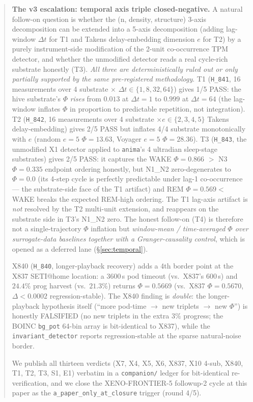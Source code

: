 \documentclass[11pt,a4paper]{article}
\begin{document}
\begin{abstract}
\textbf{The v3 escalation: temporal axis triple closed-negative.}
A natural follow-on question is whether the (n, density, structure)
3-axis decomposition can be extended into a 5-axis decomposition
(adding lag-window $\Delta t$ for T1 and Takens delay-embedding
dimension $e$ for T2) by a purely instrument-side modification of
the 2-unit co-occurrence TPM detector, and whether the unmodified
detector reads a real cycle-rich substrate honestly (T3).
\emph{All three are deterministically ruled out or only partially
supported by the same pre-registered methodology}.
T1 (\texttt{H\_841}, 16 measurements over 4 substrate $\times$
$\Delta t \in\{1,8,32,64\}$) gives 1/5 PASS: the hive substrate's
$\Phi$ \emph{rises} from $0.013$ at $\Delta t=1$ to $0.999$ at
$\Delta t=64$ (the lag-window inflates $\Phi$ in proportion to
predictable repetition, not integration). T2 (\texttt{H\_842},
16 measurements over 4 substrate $\times e\in\{2,3,4,5\}$ Takens
delay-embedding) gives 2/5 PASS but inflates 4/4 substrate
monotonically with $e$ (random $e{=}5$ $\Phi=13.63$, Voyager $e{=}5$
$\Phi=28.36$). T3 (\texttt{H\_843}, the unmodified X1 detector
applied to \texttt{anima}'s 4 ultradian sleep-stage substrates)
gives 2/5 PASS: it captures the WAKE $\Phi=0.866$ $>$ N3 $\Phi=0.335$
endpoint ordering honestly, but N1\_N2 zero-degenerates to $\Phi=0.0$
(its 4-step cycle is perfectly predictable under lag-1 co-occurrence
--- the substrate-side face of the T1 artifact) and REM
$\Phi=0.569 <$ WAKE breaks the expected REM-high ordering. The T1
lag-axis artifact is \emph{not} resolved by the T2 multi-unit
extension, and reappears on the substrate side in T3's N1\_N2 zero.
The honest follow-on (T4) is therefore not a single-trajectory $\Phi$
inflation but \emph{window-mean / time-averaged $\Phi$ over
surrogate-data baselines together with a Granger-causality control},
which is opened as a deferred lane (\S\ref{sec:temporal}).

X840 (\texttt{H\_840}, longer-playback recovery) adds a 4th border
point at the X837 SETI@home location: a $3600$\,s pod timeout
(vs.\ X837's $600$\,s) and $24.4\%$ prog harvest (vs.\ $21.3\%$)
returns $\Phi = 0.5669$ (vs.\ X837 $\Phi = 0.5670$, $\Delta < 0.0002$
regression-stable). The X840 finding is \emph{double}: the
longer-playback hypothesis itself (``more pod-time $\to$ new
triplets $\to$ new $\Phi$'') is honestly FALSIFIED (no new
triplets in the extra $3\%$ progress; the BOINC \texttt{bg\_pot}
64-bin array is bit-identical to X837), while the
\texttt{invariant\_detector} reports regression-stable at the
sparse natural-noise border.

We publish all thirteen verdicts (X7, X4, X5, X6, X837, X10 4-sub,
X840, T1, T2, T3, S1, E1) verbatim in a \texttt{companion/} ledger for
bit-identical re-verification, and we close the XENO-FRONTIER-5
followup-2 cycle at this paper as the
\texttt{a\_paper\_only\_at\_closure} trigger (round 4/5).
\end{abstract}
\end{document}
